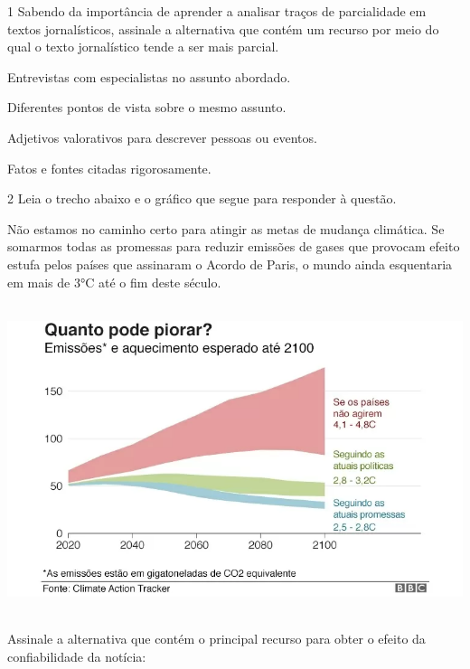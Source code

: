 \num{1} Sabendo da importância de aprender a analisar traços de parcialidade em
textos jornalísticos, assinale a alternativa que contém um recurso por meio
do qual o texto jornalístico tende a ser mais parcial.

\begin{escolha}

  \item Entrevistas com especialistas no assunto abordado.
  \item Diferentes pontos de vista sobre o mesmo assunto.
  \item Adjetivos valorativos para descrever pessoas ou eventos.
  \item Fatos e fontes citadas rigorosamente. 

\end{escolha}


\num{2} Leia o trecho abaixo e o gráfico que segue para responder à questão.

Não estamos no caminho certo para atingir as metas de mudança
climática. Se somarmos todas as promessas para reduzir emissões de gases
que provocam efeito estufa pelos países que assinaram o Acordo de Paris,
o mundo ainda esquentaria em mais de 3°C até o fim deste século.

\includegraphics[width=5.90551in,height=3.56944in]{./imgSAEB_7_POR/media/image8.png}


Assinale a alternativa que contém o principal recurso para obter o efeito da 
confiabilidade da notícia:

